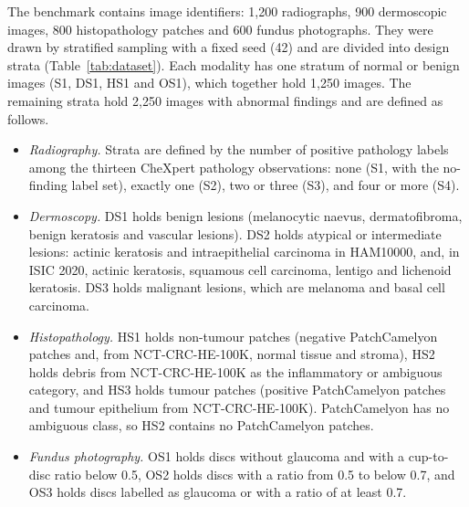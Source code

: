 The benchmark contains \Nimages{} image identifiers: 1{,}200 radiographs, 900 dermoscopic images, 800 histopathology patches and 600 fundus photographs. They were drawn by stratified sampling with a fixed seed (42) and are divided into \Nstrata{} design strata (Table~\ref{tab:dataset}). Each modality has one stratum of normal or benign images (S1, DS1, HS1 and OS1), which together hold 1{,}250 images. The remaining strata hold 2{,}250 images with abnormal findings and are defined as follows.
\begin{itemize}
  \item \emph{Radiography.} Strata are defined by the number of positive pathology labels among the thirteen CheXpert pathology observations: none (S1, with the no-finding label set), exactly one (S2), two or three (S3), and four or more (S4).
  \item \emph{Dermoscopy.} DS1 holds benign lesions (melanocytic naevus, dermatofibroma, benign keratosis and vascular lesions). DS2 holds atypical or intermediate lesions: actinic keratosis and intraepithelial carcinoma in HAM10000, and, in ISIC 2020, actinic keratosis, squamous cell carcinoma, lentigo and lichenoid keratosis. DS3 holds malignant lesions, which are melanoma and basal cell carcinoma.
  \item \emph{Histopathology.} HS1 holds non-tumour patches (negative PatchCamelyon patches and, from NCT-CRC-HE-100K, normal tissue and stroma), HS2 holds debris from NCT-CRC-HE-100K as the inflammatory or ambiguous category, and HS3 holds tumour patches (positive PatchCamelyon patches and tumour epithelium from NCT-CRC-HE-100K). PatchCamelyon has no ambiguous class, so HS2 contains no PatchCamelyon patches.
  \item \emph{Fundus photography.} OS1 holds discs without glaucoma and with a cup-to-disc ratio below 0.5, OS2 holds discs with a ratio from 0.5 to below 0.7, and OS3 holds discs labelled as glaucoma or with a ratio of at least 0.7.
\end{itemize}



